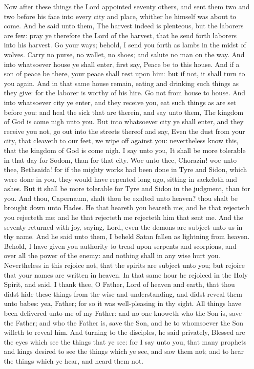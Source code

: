 Now after these things the Lord appointed seventy others, and sent them two and two before his face into every city and place, whither he himself was about to come. And he said unto them, The harvest indeed is plenteous, but the laborers are few: pray ye therefore the Lord of the harvest, that he send forth laborers into his harvest. Go your ways; behold, I send you forth as lambs in the midst of wolves. Carry no purse, no wallet, no shoes; and salute no man on the way. And into whatsoever house ye shall enter, first say, Peace be to this house. And if a son of peace be there, your peace shall rest upon him: but if not, it shall turn to you again. And in that same house remain, eating and drinking such things as they give: for the laborer is worthy of his hire. Go not from house to house. And into whatsoever city ye enter, and they receive you, eat such things as are set before you: and heal the sick that are therein, and say unto them, The kingdom of God is come nigh unto you. But into whatsoever city ye shall enter, and they receive you not, go out into the streets thereof and say, Even the dust from your city, that cleaveth to our feet, we wipe off against you: nevertheless know this, that the kingdom of God is come nigh. I say unto you, It shall be more tolerable in that day for Sodom, than for that city. Woe unto thee, Chorazin! woe unto thee, Bethsaida! for if the mighty works had been done in Tyre and Sidon, which were done in you, they would have repented long ago, sitting in sackcloth and ashes. But it shall be more tolerable for Tyre and Sidon in the judgment, than for you. And thou, Capernaum, shalt thou be exalted unto heaven? thou shalt be brought down unto Hades. He that heareth you heareth me; and he that rejecteth you rejecteth me; and he that rejecteth me rejecteth him that sent me.  And the seventy returned with joy, saying, Lord, even the demons are subject unto us in thy name. And he said unto them, I beheld Satan fallen as lightning from heaven. Behold, I have given you authority to tread upon serpents and scorpions, and over all the power of the enemy: and nothing shall in any wise hurt you. Nevertheless in this rejoice not, that the spirits are subject unto you; but rejoice that your names are written in heaven.  In that same hour he rejoiced in the Holy Spirit, and said, I thank thee, O Father, Lord of heaven and earth, that thou didst hide these things from the wise and understanding, and didst reveal them unto babes: yea, Father; for so it was well-pleasing in thy sight. All things have been delivered unto me of my Father: and no one knoweth who the Son is, save the Father; and who the Father is, save the Son, and he to whomsoever the Son willeth to reveal him. And turning to the disciples, he said privately, Blessed are the eyes which see the things that ye see: for I say unto you, that many prophets and kings desired to see the things which ye see, and saw them not; and to hear the things which ye hear, and heard them not.  